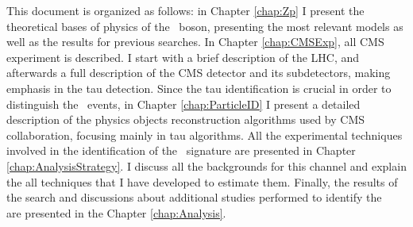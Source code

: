 \noindent This document is organized as follows: in Chapter \ref{chap:Zp} I present the theoretical bases of physics of 
the \Zprime~boson, presenting the most relevant models as well as the results for previous searches. In 
Chapter \ref{chap:CMSExp}, all CMS experiment is described. I start with a brief description 
of the LHC, and afterwards a full description of the CMS detector and its subdetectors, making emphasis 
in the tau detection. Since the tau identification is crucial in order to distinguish the \Zprime~events, in Chapter \ref{chap:ParticleID}
I present a detailed description of the physics objects reconstruction algorithms used
by CMS collaboration, focusing mainly in tau algorithms. All the experimental techniques involved in the 
identification of the \Zprimetotauh~signature are presented in Chapter \ref{chap:AnalysisStrategy}. 
I discuss all the backgrounds for this channel and explain the all techniques that I have developed 
to estimate them. Finally, the results of the search and discussions about additional studies performed to identify the \Zprime~ 
are presented in the Chapter \ref{chap:Analysis}.


